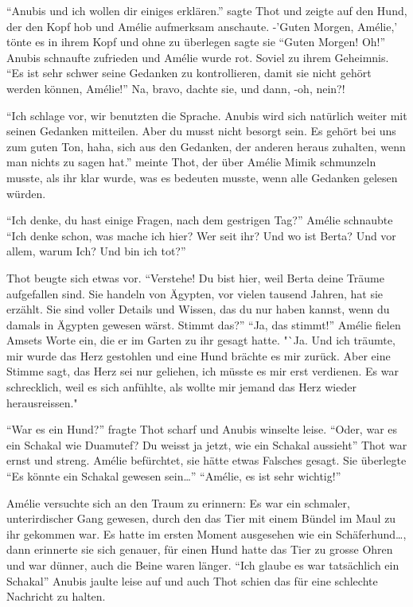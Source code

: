 \documentclass[11pt,titlepage,a5paper]{book}
\begin{document}
 "`Anubis und ich wollen dir einiges erklären."' sagte Thot und zeigte auf den Hund, der den Kopf hob und Amélie aufmerksam anschaute. -'Guten Morgen, Amélie,' tönte es in ihrem Kopf und ohne zu überlegen sagte sie "`Guten Morgen! Oh!"' Anubis schnaufte zufrieden und Amélie wurde rot. Soviel zu ihrem Geheimnis. "`Es ist sehr schwer seine Gedanken zu kontrollieren, damit sie nicht gehört werden können, Amélie!"' Na, bravo, dachte sie, und dann, -oh, nein?!
 
 "`Ich schlage vor, wir benutzten die Sprache. Anubis wird sich natürlich weiter mit seinen Gedanken mitteilen. Aber du musst nicht besorgt sein. Es gehört bei uns zum guten Ton, haha, sich aus den Gedanken, der anderen heraus zuhalten, wenn man nichts zu sagen hat."' meinte Thot, der über Amélie Mimik schmunzeln musste, als ihr klar wurde, was es bedeuten musste, wenn alle Gedanken gelesen würden. 
 
"`Ich denke, du hast einige Fragen, nach dem gestrigen Tag?"' Amélie schnaubte "`Ich denke schon, was mache ich hier? Wer seit ihr? Und wo ist Berta? Und vor allem, warum Ich? Und bin ich tot?"' 

Thot beugte sich etwas vor. "`Verstehe! Du bist hier, weil Berta deine Träume aufgefallen sind. Sie handeln von Ägypten, vor vielen tausend Jahren, hat sie erzählt. Sie sind voller Details und Wissen, das du nur haben kannst, wenn du damals in Ägypten gewesen wärst. Stimmt das?"' "`Ja, das stimmt!"' Amélie fielen Amsets Worte ein, die er im Garten zu ihr gesagt hatte. "`Ja. Und ich träumte, mir wurde das Herz gestohlen und eine Hund brächte es mir zurück. Aber eine Stimme sagt, das Herz sei nur geliehen, ich müsste es mir erst verdienen. Es war schrecklich, weil es sich anfühlte, als wollte mir jemand das Herz wieder herausreissen."

"`War es ein Hund?"' fragte Thot scharf und Anubis winselte leise. "`Oder, war es ein Schakal wie Duamutef? Du weisst ja jetzt, wie ein Schakal aussieht"' Thot war ernst und streng. Amélie befürchtet, sie hätte etwas Falsches gesagt. Sie überlegte "`Es könnte ein Schakal gewesen sein\dots"' "`Amélie, es ist sehr wichtig!"'

Amélie versuchte sich an den Traum zu erinnern: Es war ein schmaler, unterirdischer Gang gewesen, durch den das Tier mit einem Bündel im Maul zu ihr gekommen war. Es hatte im ersten Moment ausgesehen wie ein Schäferhund\dots, dann erinnerte sie sich genauer, für einen Hund hatte das Tier zu grosse Ohren und war dünner, auch die Beine waren länger. "`Ich glaube es war tatsächlich ein Schakal"' Anubis jaulte leise auf und auch Thot schien das für eine schlechte Nachricht zu halten.
\end{document}
